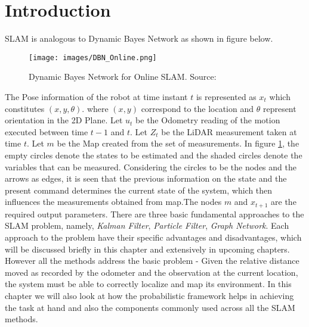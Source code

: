 \section*{Introduction}
    SLAM is analogous to Dynamic Bayes Network as shown in figure below. 
    \begin{figure}[h] \label{fig:DBNOn}
        \texttt{[image: images/DBN\_Online.png]}
        \caption{Dynamic Bayes Network for Online SLAM. Source:\cite{Thrun98aprobabilistic}}
    \end{figure}
        The Pose information of the robot at time instant $t$ is represented as $x_t$ which constitutes $(x,y,\theta)$.
where $(x,y)$ correspond to the location and $\theta$ represent orientation in the 2D Plane. Let $u_t$ be the Odometry reading of the motion executed between time $t-1$ and $t$. Let $Z_t$ be the LiDAR measurement taken at time $t$. Let $m$ be the Map created from the set of measurements. In figure \ref{fig:DBNOn}, the empty circles denote the states to be estimated and the shaded circles denote the variables that can be measured. Considering the circles to be the nodes and the arrows as edges, it is seen that the previous information on the state and the present command determines the current state of the system, which then influences the measurements obtained from map.The nodes $m$ and $x_{t+1}$ are the required output parameters. There are three basic fundamental approaches to the SLAM problem, namely, \textit{Kalman Filter}, \textit{Particle Filter}, \textit{Graph Network}. Each approach to the problem have their specific advantages and disadvantages, which will be discussed briefly in this chapter and extensively in upcoming chapters. However all the methods address the basic problem - Given the relative distance moved as recorded by the odometer and the observation at the current location, the system must be able to correctly localize and map its environment. In this chapter we will also look at how the probabilistic framework helps in achieving the task at hand and also the components commonly used across all the SLAM methods.
